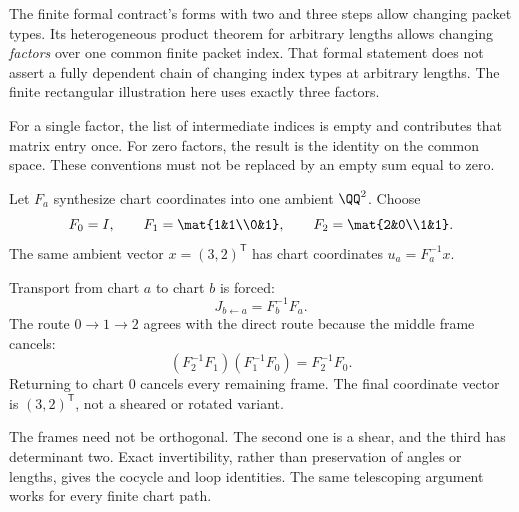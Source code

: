 The finite formal contract's forms with two and three steps allow changing packet types. Its heterogeneous product theorem for arbitrary lengths allows changing \emph{factors} over one common finite packet index. That formal statement does not assert a fully dependent chain of changing index types at arbitrary lengths. The finite rectangular illustration here uses exactly three factors.

For a single factor, the list of intermediate indices is empty and contributes that matrix entry once. For zero factors, the result is the identity on the common space. These conventions must not be replaced by an empty sum equal to zero.


Let $F_a$ synthesize chart coordinates into one ambient $\QQ^2$. Choose
\[
F_0=I,\qquad F_1=\mat{1&1\\0&1},\qquad
F_2=\mat{2&0\\1&1}.
\]
The same ambient vector $x=(3,2)^\mathsf T$ has chart coordinates $u_a=F_a^{-1}x$.


Transport from chart $a$ to chart $b$ is forced:
\[
J_{b\leftarrow a}=F_b^{-1}F_a.
\]
The route $0\to1\to2$ agrees with the direct route because the middle frame cancels:
\[
(F_2^{-1}F_1)(F_1^{-1}F_0)=F_2^{-1}F_0.
\]
Returning to chart $0$ cancels every remaining frame. The final coordinate vector is $(3,2)^\mathsf T$, not a sheared or rotated variant.

The frames need not be orthogonal. The second one is a shear, and the third has determinant two. Exact invertibility, rather than preservation of angles or lengths, gives the cocycle and loop identities. The same telescoping argument works for every finite chart path.


